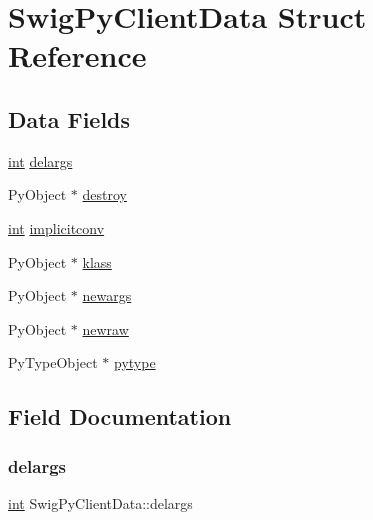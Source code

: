 \hypertarget{struct_swig_py_client_data}{}\section{Swig\+Py\+Client\+Data Struct Reference}
\label{struct_swig_py_client_data}
\subsection*{Data Fields}
\begin{DoxyCompactItemize}
\item 
\hyperlink{lp__lib_8h_adeb9ec6400320e4923ac9d836d509ddb}{int} \hyperlink{struct_swig_py_client_data_a9cb4b9b02743d09dbe216f304e2b7df0}{delargs}
\item 
Py\+Object $\ast$ \hyperlink{struct_swig_py_client_data_a1c4e62712f23db599e85e24e14818d59}{destroy}
\item 
\hyperlink{lp__lib_8h_adeb9ec6400320e4923ac9d836d509ddb}{int} \hyperlink{struct_swig_py_client_data_a5f9ebdbc04a774559a64b926b6ec4070}{implicitconv}
\item 
Py\+Object $\ast$ \hyperlink{struct_swig_py_client_data_a482d64908147c310a56d1541476079dc}{klass}
\item 
Py\+Object $\ast$ \hyperlink{struct_swig_py_client_data_a8f6dacca2c445f175d622fb9264e3715}{newargs}
\item 
Py\+Object $\ast$ \hyperlink{struct_swig_py_client_data_a4da9e7723a1319cb42cda4ad186f65a3}{newraw}
\item 
Py\+Type\+Object $\ast$ \hyperlink{struct_swig_py_client_data_a1f172e51bb27f670dacdf8247843b4c2}{pytype}
\end{DoxyCompactItemize}


\subsection{Field Documentation}
\mbox{\label{struct_swig_py_client_data_a9cb4b9b02743d09dbe216f304e2b7df0}} 
\subsubsection{\texorpdfstring{delargs}{delargs}}
{\footnotesize\ttfamily \hyperlink{lp__lib_8h_adeb9ec6400320e4923ac9d836d509ddb}{int} Swig\+Py\+Client\+Data\+::delargs}

